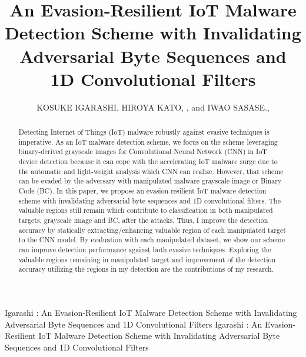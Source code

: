\documentclass{ieeeaccess}
\newcommand{\TI}{An Evasion-Resilient IoT Malware Detection Scheme with Invalidating Adversarial Byte Sequences and 1D Convolutional Filters}
\begin{document}

\title{An Evasion-Resilient IoT Malware Detection Scheme with Invalidating Adversarial Byte Sequences and 1D Convolutional Filters} 

\author{
  \uppercase{Kosuke Igarashi},
  \uppercase{Hiroya Kato}, ,
  and \uppercase{Iwao Sasase}., }
\address[1]{Department of Information and Computer Science, Faculty of Science and Technology, Keio University 3-14-1 Hiyoshi, Kohoku, Yokohama, Kanagawa 223-8522, Japan}

\markboth
{Igarashi \headeretal: \TI}
{Igarashi \headeretal: \TI}


\begingroup
\newlength{\xfigwd}
\setlength{\xfigwd}{\textwidth}

\begin{abstract}
Detecting Internet of Things (IoT) malware robustly against evasive techniques is imperative.
As an IoT malware detection scheme, we focus on the scheme leveraging binary-derived grayscale images for Convolutional Neural Network (CNN) in IoT device detection because it can cope with the accelerating IoT malware surge due to the automatic and light-weight analysis which CNN can realize.
    However, that scheme can be evaded by the adversary with manipulated malware grayscale image or Binary Code (BC).
In this paper, we propose an evasion-resilient IoT malware detection scheme with invalidating adversarial byte sequences and 1D convolutional filters.
The valuable regions still remain which contribute to classification in both manipulated targets, grayscale image and BC, after the attacks.
Thus, I improve the detection accuracy by statically extracting/enhancing valuable region of each manipulated target to the CNN model.
By evaluation with each manipulated dataset, we show our scheme can improve detection performance against both evasive techniques. 
Exploring the valuable regions remaining in manipulated target and improvement of the detection accuracy utilizing the regions in my detection are the contributions of my research. 
\end{abstract}
\end{document}
